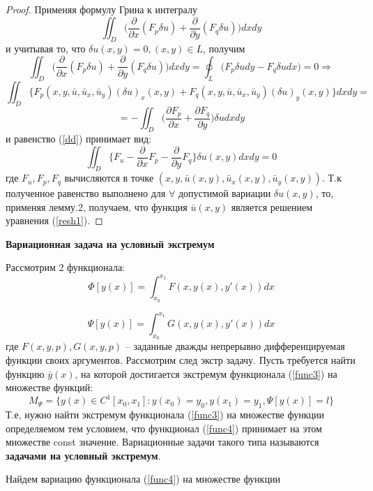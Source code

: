 \begin{proof}
    Применяя формулу Грина к интегралу
    $$\iint_D \Big( \frac{\partial}{\partial x}(F_p\delta u) + \frac{\partial}{\partial y}(F_q\delta u)\Big)dxdy$$
    и учитывая то, что $\delta u(x, y)=0, (x, y) \in L$, получим
    $$\iint_D \Big( \frac{\partial}{\partial x}(F_p\delta u) + \frac{\partial}{\partial y}(F_q\delta u)\Big)dxdy=\oint_L\Big(F_p\delta udy-F_q\delta udx\Big)=0\Longrightarrow$$
    $$\iint_D \Big\{ F_p(x,y,\bar u, \bar u_x, \bar u_y)(\delta u)_x(x, y)+F_q(x,y,\bar u, \bar u_x, \bar u_y)(\delta u)_y(x, y)\Big\}dxdy=$$
    $$=-\iint_D \Big( \frac{\partial F_p}{\partial x}+\frac{\partial F_q}{\partial y}\Big)\delta u dxdy$$
    и равенство (\ref{dd}) принимает вид:
    $$\iint_D \Big\{F_u-\frac{\partial}{\partial x}F_p-\frac{\partial}{\partial y}F_q\Big\}\delta u(x,y)dxdy=0$$
    где $F_u,F_p,F_q$ вычисляются в точке $(x, y, \bar u(x, y), \bar u_x(x, y), \bar u_y(x, y))$. Т.к полученное равенство выполнено для $\forall$ допустимой вариации
    $\delta u(x, y)$, то, применяя лемму.2, получаем, что функция $\bar u(x, y)$ является решением уравнения (\ref{resh1}).
\end{proof}

\textbf{Вариационная задача на условный экстремум}

Рассмотрим 2 функционала:
\begin{equation}
    \Phi[y(x)]=\int_{x_0}^{x_1} F(x,y(x),y'(x))dx
    \label{func3}
\end{equation}

\begin{equation}
    \Psi[y(x)]=\int_{x_0}^{x_1} G(x,y(x),y'(x))dx
    \label{func4}
\end{equation}
где $F(x, y, p), G(x, y, p)$ – заданные дважды непрерывно дифференцируемая функции своих аргументов.
Рассмотрим след экстр задачу. Пусть требуется найти функцию $\bar y(x)$, на которой достигается экстремум функционала (\ref{func3}) на множестве функций:
$$M_\Psi=\{y(x)\in C^1[x_0, x_1] : y(x_0) = y_0, y(x_1) = y_1, \Psi[y(x)]=l\}$$
Т.е, нужно найти экстремум функционала (\ref{func3}) на
множестве функции определяемом тем условием, что функционал (\ref{func4})
принимает на этом множестве const значение. Вариационные задачи такого типа называются \textbf{задачами на условный экстремум}.

Найдем вариацию функционала (\ref{func4}) на множестве функции 

